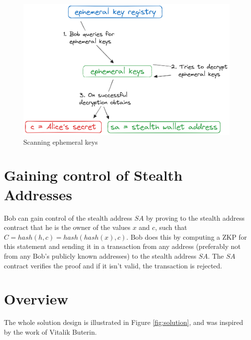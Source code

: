 \begin{figure}[h]
    \centering
    \includegraphics[scale=0.3]{assets/images/ephemeral-keys.png}
    \caption{Scanning ephemeral keys}
    \label{fig:scanning-ephemeral-keys}
    \vspace{0.5cm}
\end{figure}

\section{Gaining control of Stealth Addresses}

Bob can gain control of the stealth address $SA$ by proving to the stealth
address contract that he is the owner of the values $x$ and $c$, such that\\
$C = hash(h, c) = hash(hash(x), c)$. Bob does this by computing a ZKP for 
this statement and sending it in a transaction from any address (preferably
not from any Bob's publicly known addresses) to the stealth address $SA$. The
$SA$ contract verifies the proof and if it isn't valid, the transaction is
rejected.

\section{Overview}

The whole solution design is illustrated in Figure \ref{fig:solution},
and was inspired by the work of Vitalik Buterin\cite{ButerinIncompleteGuide}.

